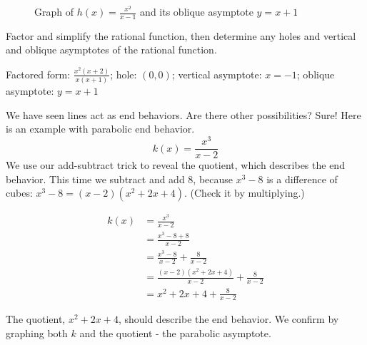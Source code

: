 \begin{figure}[H]
  \centering
  \caption{Graph of \( h(x) = \frac{x^2}{x - 1} \) and its oblique asymptote \( y = x + 1 \)}
\end{figure}

\begin{Exercise}[title=Rational Functions Practice 2, label=ratfunc2_b]
  Factor and simplify the rational function, then determine any holes and vertical and oblique asymptotes of the rational function.
  \vspace{40mm}
\end{Exercise}
\begin{Answer}[ref=ratfunc2_b]Factored form: $\frac{x^2(x + 2)}{x(x + 1)}$; hole: $(0, 0)$; vertical asymptote: $x = -1$; oblique asymptote: $y = x + 1$\end{Answer}

We have seen lines act as end behaviors. Are there other possibilities? Sure! Here is an example with parabolic end behavior. 
\[ k(x) = \frac{x^3}{x - 2} \]
We use our add-subtract trick to reveal the quotient, which describes the
end behavior. This time we subtract and add 8, because $x^3 - 8$ is a
difference of cubes: $x^3 - 8 = (x - 2)(x^2 + 2x + 4)$. (Check it by
multiplying.)

\begin{equation} \label{eq1_4}
\begin{split}
k(x) & = \frac{x^3}{x - 2} \\
& = \frac{x^3 - 8 + 8}{x - 2} \\ 
& = \frac{x^3 - 8}{x - 2} + \frac{8}{x - 2} \\
& = \frac{(x - 2)(x^2 + 2x + 4)}{x - 2} + \frac{8}{x - 2} \\
& = x^2 + 2x + 4 + \frac{8}{x - 2}
\end{split}
\end{equation}

The quotient, \( x^2 + 2x + 4 \), should describe the end behavior. We confirm by graphing both \( k \) and the quotient - the parabolic asymptote.


